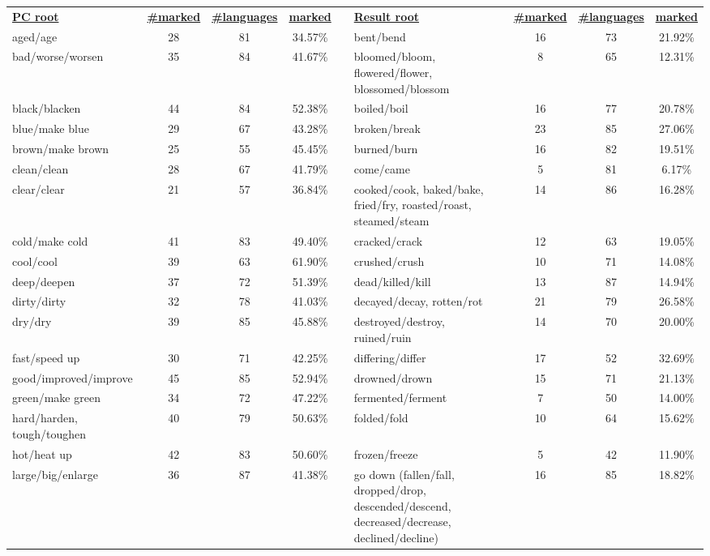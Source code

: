 \begin{tabular}{p{3cm}ccccp{3cm}ccc}
\underline{\textbf{PC root}} & \underline{\textbf{\#marked}} & \underline{\textbf{\#languages}} & \underline{\textbf{marked}} & & \underline{\textbf{Result root}} & \underline{\textbf{\#marked}} & \underline{\textbf{\#languages}} & \underline{\textbf{marked}} \\
aged/age & 28 & 81 & 34.57\% & & bent/bend & 16 & 73 & 21.92\% \\
bad/worse/worsen & 35 & 84 & 41.67\% & & bloomed/bloom, flowered/flower, blossomed/blossom & 8 & 65 & 12.31\% \\
black/blacken & 44 & 84 & 52.38\% & & boiled/boil & 16 & 77 & 20.78\% \\
blue/make blue & 29 & 67 & 43.28\% & & broken/break & 23 & 85 & 27.06\% \\
brown/make brown & 25 & 55 & 45.45\% & & burned/burn & 16 & 82 & 19.51\% \\
clean/clean & 28 & 67 & 41.79\% & & come/came & 5 & 81 & 6.17\% \\
clear/clear & 21 & 57 & 36.84\% & & cooked/cook, baked/bake, fried/fry, roasted/roast, steamed/steam & 14 & 86 & 16.28\% \\
cold/make cold & 41 & 83 & 49.40\% & & cracked/crack & 12 & 63 & 19.05\% \\
cool/cool & 39 & 63 & 61.90\% & & crushed/crush & 10 & 71 & 14.08\% \\
deep/deepen & 37 & 72 & 51.39\% & & dead/killed/kill & 13 & 87 & 14.94\% \\
dirty/dirty & 32 & 78 & 41.03\% & & decayed/decay, rotten/rot & 21 & 79 & 26.58\% \\
dry/dry & 39 & 85 & 45.88\% & & destroyed/destroy, ruined/ruin & 14 & 70 & 20.00\% \\
fast/speed up & 30 & 71 & 42.25\% & & differing/differ & 17 & 52 & 32.69\% \\
good/improved/improve & 45 & 85 & 52.94\% & & drowned/drown & 15 & 71 & 21.13\% \\
green/make green & 34 & 72 & 47.22\% & & fermented/ferment & 7 & 50 & 14.00\% \\
hard/harden, tough/toughen & 40 & 79 & 50.63\% & & folded/fold & 10 & 64 & 15.62\% \\
hot/heat up & 42 & 83 & 50.60\% & & frozen/freeze & 5 & 42 & 11.90\% \\
large/big/enlarge & 36 & 87 & 41.38\% & & go down (fallen/fall, dropped/drop, descended/descend, decreased/decrease, declined/decline) & 16 & 85 & 18.82\% \\

\end{tabular}
